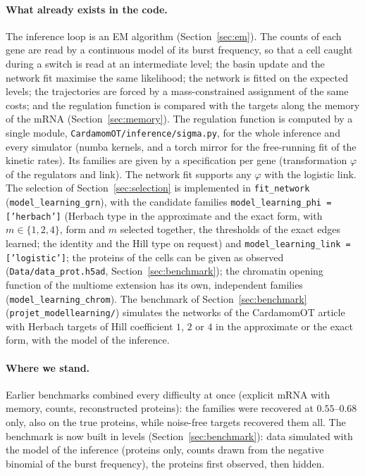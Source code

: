 \documentclass[a4paper, 11pt]{article}
\theoremstyle{plain}
\theoremstyle{remark}
\begin{document}
\paragraph{What already exists in the code.} The inference loop is an EM algorithm (Section~\ref{sec:em}). The counts of each gene are read by a continuous model of its burst frequency, so that a cell caught during a switch is read at an intermediate level; the basin update and the network fit maximise the same likelihood; the network is fitted on the expected levels; the trajectories are forced by a mass-constrained assignment of the same costs; and the regulation function is compared with the targets along the memory of the mRNA (Section~\ref{sec:memory}). The regulation function is computed by a single module, \texttt{CardamomOT/inference/sigma.py}, for the whole inference and every simulator (numba kernels, and a torch mirror for the free-running fit of the kinetic rates). Its families are given by a specification per gene (transformation $\varphi$ of the regulators and link). The network fit supports any $\varphi$ with the logistic link. The selection of Section~\ref{sec:selection} is implemented in \texttt{fit\_network} (\texttt{model\_learning\_grn}), with the candidate families \texttt{model\_learning\_phi = ['herbach']} (Herbach type in the approximate and the exact form, with $m \in \{1, 2, 4\}$, form and $m$ selected together, the thresholds of the exact edges learned; the identity and the Hill type on request) and \texttt{model\_learning\_link = ['logistic']}; the proteins of the cells can be given as observed (\texttt{Data/data\_prot.h5ad}, Section~\ref{sec:benchmark}); the chromatin opening function of the multiome extension has its own, independent families (\texttt{model\_learning\_chrom}). The benchmark of Section~\ref{sec:benchmark} (\texttt{projet\_modellearning/}) simulates the networks of the CardamomOT article with Herbach targets of Hill coefficient $1$, $2$ or $4$ in the approximate or the exact form, with the model of the inference.

\paragraph{Where we stand.} Earlier benchmarks combined every difficulty at once (explicit mRNA with memory, counts, reconstructed proteins): the families were recovered at $0.55$--$0.68$ only, also on the true proteins, while noise-free targets recovered them all. The benchmark is now built in levels (Section~\ref{sec:benchmark}): data simulated with the model of the inference (proteins only, counts drawn from the negative binomial of the burst frequency), the proteins first observed, then hidden.
\end{document}
